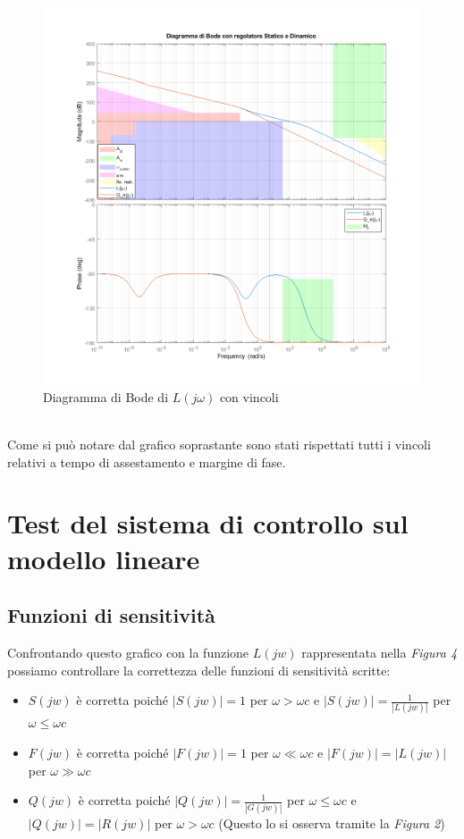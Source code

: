 \documentclass{article}
\begin{document}
\begin{figure}[!h]
\centering
\includegraphics[width=1\textwidth]{grafici/fig3.png}
\caption{\label{fig:orbit}Diagramma di Bode di $L(j\omega)$ con vincoli}
\end{figure}\\
Come si può notare dal grafico soprastante sono stati rispettati tutti i vincoli relativi a tempo di assestamento e margine di fase.
\pagebreak

\section{Test del sistema di controllo sul modello lineare}
\subsection{Funzioni di sensitività}
Confrontando questo grafico con la funzione $L(jw)$ rappresentata nella \textit{Figura 4} possiamo controllare la correttezza delle funzioni di sensitività scritte:
\begin{itemize}
\item $S(jw)$ è corretta poiché $|S(jw)| = 1$ per $\omega > \omega c  $ e  $|S(jw)| = \frac{1}{|L(jw)|} $ per $\omega \leq \omega c $
\item $F(jw)$ è corretta poiché $|F(jw)| = 1$ per $\omega \ll \omega c $ e  $|F(jw)| = |L(jw)| $ per $\omega \gg \omega c$
\item $Q(jw)$ è corretta poiché $|Q(jw)| = \frac{1}{|G(jw)|}$ per $\omega \leq \omega c $ e  $|Q(jw)| = |R(jw)| $ per $\omega > \omega c$ (Questo lo si osserva tramite la \textit{Figura 2})

\end{itemize}
\end{document}
